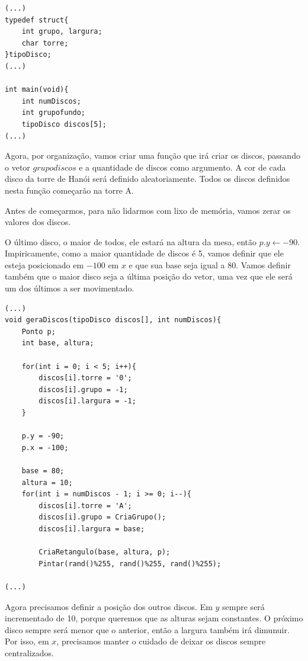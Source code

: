  \begin{lstlisting}[caption={Torres.}, style=tuto] 
 (...)
typedef struct{
    int grupo, largura;
    char torre;
}tipoDisco;
(...)

int main(void){
    int numDiscos;
    int grupofundo;
    tipoDisco discos[5];
(...)
\end{lstlisting}

Agora, por organização, vamos criar uma função que irá criar os discos, passando o vetor $grupodiscos$ e a quantidade de discos como argumento. A cor de cada disco da torre de Hanói será definido aleatoriamente. Todos os discos definidos nesta função começarão na torre A.

Antes de começarmos, para não lidarmos com lixo de memória, vamos zerar os valores dos discos.

O último disco, o maior de todos, ele estará na altura da mesa, então $p.y \gets -90$. Impiricamente, como a maior quantidade de discos é 5, vamos definir que ele esteja posicionado em $-100$ em $x$ e que sua base seja igual a $80$. Vamos definir também que o maior disco seja a última posição do vetor, uma vez que ele será um dos últimos a ser movimentado.

%
 \begin{lstlisting}[caption={Último disco.}, style=tuto] 
 (...)
void geraDiscos(tipoDisco discos[], int numDiscos){
    Ponto p;
    int base, altura;
    
    for(int i = 0; i < 5; i++){
        discos[i].torre = '0';
        discos[i].grupo = -1;
        discos[i].largura = -1;
    }

    p.y = -90;
    p.x = -100;

    base = 80;
    altura = 10;
    for(int i = numDiscos - 1; i >= 0; i--){
        discos[i].torre = 'A';
        discos[i].grupo = CriaGrupo();
        discos[i].largura = base;

        CriaRetangulo(base, altura, p);
        Pintar(rand()%255, rand()%255, rand()%255);

(...)
\end{lstlisting}

Agora precisamos definir a posição dos outros discos. Em $y$ sempre será incrementado de 10, porque queremos que as alturas sejam constantes. O próximo disco sempre será menor que o anterior, então a largura também irá dimunuir. Por isso, em $x$, precisamos manter o cuidado de deixar os discos sempre centralizados.

